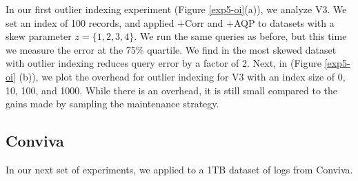 In our first outlier indexing experiment (Figure \ref{exp5-oi}(a)), we analyze V3.
We set an index of 100 records, and applied \svcnospace+Corr and \svcnospace+AQP to datasets with a skew parameter $z=\{1,2,3,4\}$. 
We run the same queries as before, but this time we measure the error at the 75\% quartile.
We find in the most skewed dataset \svc with outlier indexing reduces query error by a factor of 2.
Next, in \big(Figure \ref{exp5-oi} (b)\big), we plot the overhead for outlier indexing for V3 with an index size of 0, 10, 100, and 1000.
While there is an overhead, it is still small compared to the gains made by sampling the maintenance strategy.

\subsection{Conviva}
In our next set of experiments, we applied \svc to a 1TB dataset of logs from Conviva.
